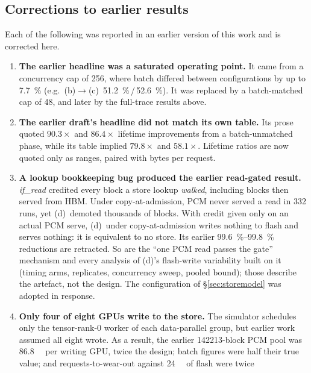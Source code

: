 \documentclass[conference]{IEEEtran}
\newcommand{\cfgb}{\textsf{(b)}}
\newcommand{\cfgc}{\textsf{(c)}}
\newcommand{\cfgd}{\textsf{(d)}}
\begin{document}
\subsection{Corrections to earlier results}\label{sec:corrections}
Each of the following was reported in an earlier version of this work and is
corrected here.
\begin{enumerate}
  \item \textbf{The earlier headline was a saturated operating point.} It came
        from a concurrency cap of 256, where batch differed between
        configurations by up to \SI{7.7}{\percent} (e.g.\ \cfgb$\to$\cfgc\
        \SI{51.2}{\percent}\,/\,\SI{52.6}{\percent}). It was replaced by a
        batch-matched cap of 48, and later by the full-trace results above.
  \item \textbf{The earlier draft's headline did not match its own table.} Its
        prose quoted $90.3\times$ and $86.4\times$ lifetime improvements from a
        batch-unmatched phase, while its table implied $79.8\times$ and
        $58.1\times$. Lifetime ratios are now quoted only as ranges, paired with
        bytes per request.
  \item \textbf{A lookup bookkeeping bug produced the earlier read-gated
        result.} \emph{if\_read} credited every block a store lookup
        \emph{walked}, including blocks then served from HBM. Under
        copy-at-admission, PCM never served a read in 332 runs, yet \cfgd\
        demoted thousands of blocks. With credit given only on an actual PCM
        serve, \cfgd\ under copy-at-admission writes nothing to flash and serves
        nothing: it is equivalent to no store. Its earlier
        \SIrange{99.6}{99.8}{\percent} reductions are retracted. So are the
        ``one PCM read passes the gate'' mechanism and every analysis of
        \cfgd's flash-write variability built on it (timing arms, replicates,
        concurrency sweep, pooled bound); those describe the artefact, not the
        design. The configuration of \S\ref{sec:storemodel} was adopted in
        response.
  \item \textbf{Only four of eight GPUs write to the store.} The simulator
        schedules only the tensor-rank-0 worker of each data-parallel group,
        but earlier work assumed all eight wrote. As a result, the earlier
        \num{142213}-block PCM pool was \SI{86.8}{\gibi\byte} per writing GPU,
        twice the design; batch figures were half their true value; and
        requests-to-wear-out against \SI{24}{\tebi\byte} of flash were twice

\end{enumerate}
\end{document}
